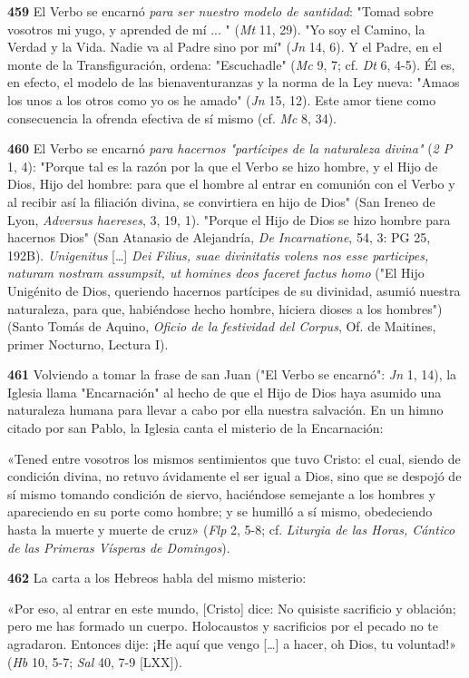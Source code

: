 \documentclass[]{article}
\begin{document}
\textbf{459} El Verbo se encarnó \emph{para ser nuestro modelo de
santidad}: "Tomad sobre vosotros mi yugo, y aprended de mí ... "
(\emph{Mt} 11, 29). "Yo soy el Camino, la Verdad y la Vida. Nadie va al
Padre sino por mí" (\emph{Jn} 14, 6). Y el Padre, en el monte de la
Transfiguración, ordena: "Escuchadle" (\emph{Mc} 9, 7; cf. \emph{Dt} 6,
4-5). Él es, en efecto, el modelo de las bienaventuranzas y la norma de
la Ley nueva: "Amaos los unos a los otros como yo os he amado"
(\emph{Jn} 15, 12). Este amor tiene como consecuencia la ofrenda
efectiva de sí mismo (cf. \emph{Mc} 8, 34).

\textbf{460} El Verbo se encarnó \emph{para hacernos "partícipes de la
naturaleza divina"} (\emph{2 P} 1, 4): "Porque tal es la razón por la
que el Verbo se hizo hombre, y el Hijo de Dios, Hijo del hombre: para
que el hombre al entrar en comunión con el Verbo y al recibir así la
filiación divina, se convirtiera en hijo de Dios" (San Ireneo de Lyon,
\emph{Adversus haereses}, 3, 19, 1). "Porque el Hijo de Dios se hizo
hombre para hacernos Dios" (San Atanasio de Alejandría, \emph{De
Incarnatione}, 54, 3: PG 25, 192B). \emph{Unigenitus} [\ldots{}]
\emph{Dei Filius, suae divinitatis volens nos esse participes, naturam
nostram assumpsit, ut homines deos faceret factus homo} ("El Hijo
Unigénito de Dios, queriendo hacernos partícipes de su divinidad, asumió
nuestra naturaleza, para que, habiéndose hecho hombre, hiciera dioses a
los hombres") (Santo Tomás de Aquino, \emph{Oficio de la festividad del
Corpus}, Of. de Maitines, primer Nocturno, Lectura I).

\textbf{461} Volviendo a tomar la frase de san Juan ("El Verbo se
encarnó": \emph{Jn} 1, 14), la Iglesia llama "Encarnación" al hecho de
que el Hijo de Dios haya asumido una naturaleza humana para llevar a
cabo por ella nuestra salvación. En un himno citado por san Pablo, la
Iglesia canta el misterio de la Encarnación:

«Tened entre vosotros los mismos sentimientos que tuvo Cristo: el cual,
siendo de condición divina, no retuvo ávidamente el ser igual a Dios,
sino que se despojó de sí mismo tomando condición de siervo, haciéndose
semejante a los hombres y apareciendo en su porte como hombre; y se
humilló a sí mismo, obedeciendo hasta la muerte y muerte de cruz»
(\emph{Flp} 2, 5-8; cf. \emph{Liturgia de las Horas, Cántico de las
Primeras Vísperas de Domingos}).

\textbf{462} La carta a los Hebreos habla del mismo misterio:

«Por eso, al entrar en este mundo, {[}Cristo{]} dice: No quisiste
sacrificio y oblación; pero me has formado un cuerpo. Holocaustos y
sacrificios por el pecado no te agradaron. Entonces dije: ¡He aquí que
vengo [\ldots{}] a hacer, oh Dios, tu voluntad!» (\emph{Hb} 10, 5-7;
\emph{Sal} 40, 7-9 {[}LXX{]}).
\end{document}
